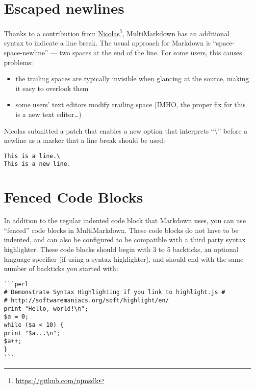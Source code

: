 \section{Escaped newlines}
\label{escapednewlines}

Thanks to a contribution from \href{https://github.com/njmsdk}{Nicolas}\footnote{\href{https://github.com/njmsdk}{https:\slash \slash github.com\slash njmsdk}}, MultiMarkdown has an additional syntax to indicate a line break. The usual approach for Markdown is ``space-space-newline'' --- two spaces at the end of the line. For some users, this causes problems:

\begin{itemize}
\item the trailing spaces are typically invisible when glancing at the source, making it easy to overlook them

\item some users' text editors modify trailing space (IMHO, the proper fix for this is a new text editor{\ldots})

\end{itemize}

Nicolas submitted a patch that enables a new option that interprets ``\textbackslash{}'' before a newline as a marker that a line break should be used:

\begin{verbatim}
This is a line.\
This is a new line.
\end{verbatim}

\section{Fenced Code Blocks}
\label{fencedcodeblocks}

In addition to the regular indented code block that Markdown uses, you can use ``fenced'' code blocks in MultiMarkdown. These code blocks do not have to be indented, and can also be configured to be compatible with a third party syntax highlighter. These code blocks should begin with 3 to 5 backticks, an optional language specifier (if using a syntax highlighter), and should end with the same number of backticks you started with:

\begin{verbatim}
```perl
# Demonstrate Syntax Highlighting if you link to highlight.js #
# http://softwaremaniacs.org/soft/highlight/en/
print "Hello, world!\n";
$a = 0;
while ($a < 10) {
print "$a...\n";
$a++;
}
```
\end{verbatim}

